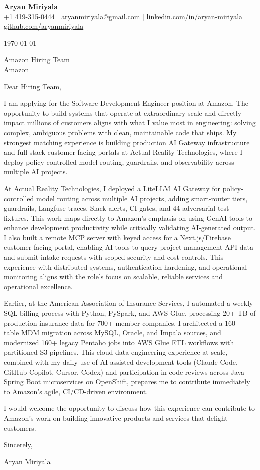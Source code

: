 \documentclass[letterpaper,11pt]{article}
\begin{document}
\begin{center}
  {\LARGE \textbf{Aryan Miriyala}}\\[2pt]
  \small
  +1 419-315-0444 $|$ \href{mailto:aryanmiriyala@gmail.com}{aryanmiriyala@gmail.com} $|$ \href{https://www.linkedin.com/in/aryan-miriyala-7788a21b6/}{linkedin.com/in/aryan-miriyala}\\
  \href{https://github.com/aryanmiriyala}{github.com/aryanmiriyala}
\end{center}\vspace{12pt}

\today\vspace{12pt}

Amazon Hiring Team\\
Amazon\\
\vspace{12pt}

Dear Hiring Team,

I am applying for the Software Development Engineer position at Amazon. The opportunity to build systems that operate at extraordinary scale and directly impact millions of customers aligns with what I value most in engineering: solving complex, ambiguous problems with clean, maintainable code that ships. My strongest matching experience is building production AI Gateway infrastructure and full-stack customer-facing portals at Actual Reality Technologies, where I deploy policy-controlled model routing, guardrails, and observability across multiple AI projects.

At Actual Reality Technologies, I deployed a LiteLLM AI Gateway for policy-controlled model routing across multiple AI projects, adding smart-router tiers, guardrails, Langfuse traces, Slack alerts, CI gates, and 44 adversarial test fixtures. This work maps directly to Amazon's emphasis on using GenAI tools to enhance development productivity while critically validating AI-generated output. I also built a remote MCP server with keyed access for a Next.js/Firebase customer-facing portal, enabling AI tools to query project-management API data and submit intake requests with scoped security and cost controls. This experience with distributed systems, authentication hardening, and operational monitoring aligns with the role's focus on scalable, reliable services and operational excellence.

Earlier, at the American Association of Insurance Services, I automated a weekly SQL billing process with Python, PySpark, and AWS Glue, processing 20+ TB of production insurance data for 700+ member companies. I architected a 160+ table MDM migration across MySQL, Oracle, and Impala sources, and modernized 160+ legacy Pentaho jobs into AWS Glue ETL workflows with partitioned S3 pipelines. This cloud data engineering experience at scale, combined with my daily use of AI-assisted development tools (Claude Code, GitHub Copilot, Cursor, Codex) and participation in code reviews across Java Spring Boot microservices on OpenShift, prepares me to contribute immediately to Amazon's agile, CI/CD-driven environment.

I would welcome the opportunity to discuss how this experience can contribute to Amazon's work on building innovative products and services that delight customers.

Sincerely,

Aryan Miriyala
\end{document}

